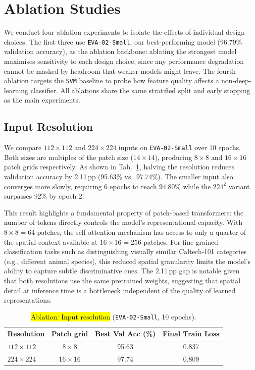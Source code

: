 \section{Ablation Studies}

We conduct four ablation experiments to isolate the effects of individual design choices. The first three use \texttt{EVA-02-Small}, our best-performing model (96.79\% validation accuracy), as the ablation backbone: ablating the strongest model maximises sensitivity to each design choice, since any performance degradation cannot be masked by headroom that weaker models might leave. The fourth ablation targets the \texttt{SVM} baseline to probe how feature quality affects a non-deep-learning classifier. All ablations share the same stratified split and early stopping as the main experiments.

\subsection{Input Resolution}

We compare $112{\times}112$ and $224{\times}224$ inputs on \texttt{EVA-02-Small} over 10 epochs. Both sizes are multiples of the patch size ($14{\times}14$), producing $8{\times}8$ and $16{\times}16$ patch grids respectively. As shown in Tab.~\ref{tab:ablation_imgsize}, halving the resolution reduces validation accuracy by 2.11\,pp (95.63\% vs.\ 97.74\%). The smaller input also converges more slowly, requiring 6 epochs to reach 94.80\% while the $224^2$ variant surpasses 92\% by epoch 2.

This result highlights a fundamental property of patch-based transformers: the number of tokens directly controls the model's representational capacity. With $8{\times}8{=}64$ patches, the self-attention mechanism has access to only a quarter of the spatial context available at $16{\times}16{=}256$ patches. For fine-grained classification tasks such as distinguishing visually similar Caltech-101 categories (e.g., different animal species), this reduced spatial granularity limits the model's ability to capture subtle discriminative cues. The 2.11\,pp gap is notable given that both resolutions use the same pretrained weights, suggesting that spatial detail at inference time is a bottleneck independent of the quality of learned representations.

\begin{table}[t]
\centering
\caption{\hl{Ablation: Input resolution} (\texttt{EVA-02-Small}, 10 epochs).}
\label{tab:ablation_imgsize}
\small
\begin{tabular}{lccc}
\toprule
Resolution & Patch grid & Best Val Acc (\%) & Final Train Loss \\
\midrule
$112{\times}112$ & $8{\times}8$   & 95.63 & 0.837 \\
$224{\times}224$ & $16{\times}16$ & \cellcolor{blue!8}97.74 & 0.809 \\
\bottomrule
\end{tabular}
\end{table}

